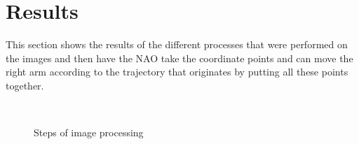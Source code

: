 \documentclass[conference]{IEEEtran}
\begin{document}
\section{Results}

This section shows the results of the different processes that were performed on the images and then have the NAO take the coordinate points and can move the right arm according to the trajectory that originates by putting all these points together.

\begin{figure}[htb]
\centering
~
~
~
~
~
\caption{Steps of image processing} \label{fig:triangle}
\end{figure}
\end{document}
